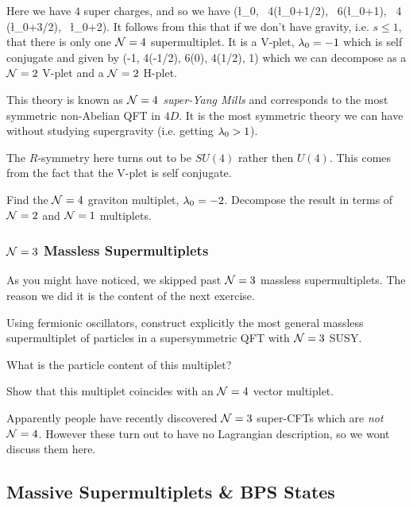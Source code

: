 Here we have $4$ super charges, and so we have 
\bse 
    (\l_0, \, 4\times (\l_0+1/2), \, 6\times(\l_0+1), \, 4 \times (\l_0+3/2), \, \l_0+2).
\ese 
It follows from this that if we don't have gravity, i.e. $s \leq 1$, that there is only one $\mathcal{N}=4$ supermultiplet. It is a V-plet, $\lambda_0=-1$ which is self conjugate and given by
\bse 
    (-1, 4\times(-1/2), 6\times(0), 4\times(1/2), 1)
\ese
which we can decompose as a $\mathcal{N}=2$ V-plet and a $\mathcal{N}=2$ H-plet. 

This theory is known as \textit{$\mathcal{N}=4$ super-Yang Mills} and corresponds to the most symmetric non-Abelian QFT in $4D$. It is the most symmetric theory we can have without studying supergravity (i.e. getting $\lambda_0>1$). 

\br 
    The $R$-symmetry here turns out to be $SU(4)$ rather then $U(4)$. This comes from the fact that the V-plet is self conjugate.
\er 

\bbox 
    Find the $\mathcal{N}=4$ graviton multiplet, $\lambda_0=-2$. Decompose the result in terms of $\mathcal{N}=2$ and $\mathcal{N}=1$ multiplets.
\ebox 

\subsubsection{$\mathcal{N}=3$ Massless Supermultiplets}

As you might have noticed, we skipped past $\mathcal{N}=3$ massless supermultiplets. The reason we did it is the content of the next exercise.

\bbox 
    Using fermionic oscillators, construct explicitly the most general massless supermultiplet of particles in a supersymmetric QFT with $\mathcal{N} = 3$ SUSY.
    \ben 
        \item What is the particle content of this multiplet?
        \item Show that this multiplet coincides with an $\mathcal{N} = 4$ vector multiplet.
    \een 
\ebox 

\br 
    Apparently people have recently discovered $\mathcal{N}=3$ super-CFTs which are \textit{not} $\mathcal{N}=4$. However these turn out to have no Lagrangian description, so we wont discuss them here. 
\er 

\subsection{Massive Supermultiplets \& BPS States}

